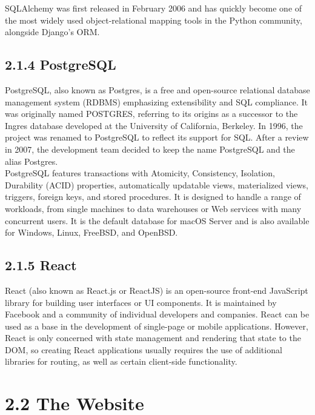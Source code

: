 SQLAlchemy was first released in February 2006 and has quickly become one of the most widely used object-relational mapping tools in the Python community, alongside Django's ORM.



\subsection*{2.1.4 \hspace{1cm} PostgreSQL}
PostgreSQL, also known as Postgres, is a free and open-source relational database management system (RDBMS) emphasizing extensibility and SQL compliance. It was originally named POSTGRES, referring to its origins as a successor to the Ingres database developed at the University of California, Berkeley. In 1996, the project was renamed to PostgreSQL to reflect its support for SQL. After a review in 2007, the development team decided to keep the name PostgreSQL and the alias Postgres. \\

PostgreSQL features transactions with Atomicity, Consistency, Isolation, Durability (ACID) properties, automatically updatable views, materialized views, triggers, foreign keys, and stored procedures. It is designed to handle a range of workloads, from single machines to data warehouses or Web services with many concurrent users. It is the default database for macOS Server and is also available for Windows, Linux, FreeBSD, and OpenBSD.


\subsection*{2.1.5 \hspace{1cm} React}
React (also known as React.js or ReactJS) is an open-source front-end JavaScript library for building user interfaces or UI components. It is maintained by Facebook and a community of individual developers and companies. React can be used as a base in the development of single-page or mobile applications. However, React is only concerned with state management and rendering that state to the DOM, so creating React applications usually requires the use of additional libraries for routing, as well as certain client-side functionality. \\

\section*{2.2 \hspace{1cm} The Website}
